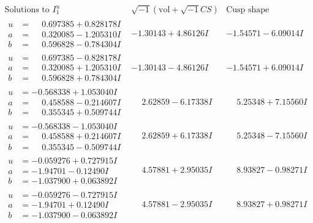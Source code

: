 \documentclass[1p]{elsarticle_modified}
\theoremstyle{definition}
\newcommand{\I}{\sqrt{-1}}
\begin{document}
$$\begin{array}{c|c|c}  
\text{Solutions to }I^u_{1}& \I (\text{vol} + \sqrt{-1}CS) & \text{Cusp shape}\\
 \hline 
\begin{aligned}
u &= \phantom{-}0.697385 + 0.828178 I \\
a &= \phantom{-}0.320085 - 1.205310 I \\
b &= \phantom{-}0.596828 - 0.784304 I\end{aligned}
 & -1.30143 + 4.86126 I & -1.54571 - 6.09014 I \\ \hline\begin{aligned}
u &= \phantom{-}0.697385 - 0.828178 I \\
a &= \phantom{-}0.320085 + 1.205310 I \\
b &= \phantom{-}0.596828 + 0.784304 I\end{aligned}
 & -1.30143 - 4.86126 I & -1.54571 + 6.09014 I \\ \hline\begin{aligned}
u &= -0.568338 + 1.053040 I \\
a &= \phantom{-}0.458588 - 0.214607 I \\
b &= \phantom{-}0.355345 + 0.509744 I\end{aligned}
 & \phantom{-}2.62859 - 6.17338 I & \phantom{-}5.25348 + 7.15560 I \\ \hline\begin{aligned}
u &= -0.568338 - 1.053040 I \\
a &= \phantom{-}0.458588 + 0.214607 I \\
b &= \phantom{-}0.355345 - 0.509744 I\end{aligned}
 & \phantom{-}2.62859 + 6.17338 I & \phantom{-}5.25348 - 7.15560 I \\ \hline\begin{aligned}
u &= -0.059276 + 0.727915 I \\
a &= -1.94701 - 0.12490 I \\
b &= -1.037900 + 0.063892 I\end{aligned}
 & \phantom{-}4.57881 + 2.95035 I & \phantom{-}8.93827 - 0.98271 I \\ \hline\begin{aligned}
u &= -0.059276 - 0.727915 I \\
a &= -1.94701 + 0.12490 I \\
b &= -1.037900 - 0.063892 I\end{aligned}
 & \phantom{-}4.57881 - 2.95035 I & \phantom{-}8.93827 + 0.98271 I \\ \hline\begin{aligned}

\end{aligned}
\end{array}$$
\end{document}
